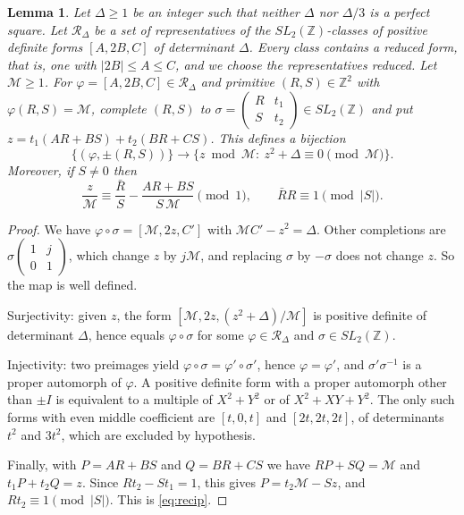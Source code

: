 \documentclass[11pt]{amsart}
\newtheorem{lemma}[theorem]{Lemma}
\theoremstyle{remark}
\theoremstyle{definition}
\numberwithin{equation}{section}
\newcommand{\Z}{\mathbb{Z}}
\begin{document}
\begin{lemma}\label{lem:gauss}
Let $\Delta\ge1$ be an integer such that neither $\Delta$ nor $\Delta/3$ is a perfect square. Let $\mathcal R_\Delta$ be a set of representatives of the $SL_2(\Z)$-classes of positive definite forms $[A,2B,C]$ of determinant $\Delta$. Every class contains a reduced form, that is, one with $|2B|\le A\le C$, and we choose the representatives reduced. Let $\mathcal M\ge1$. For $\varphi=[A,2B,C]\in\mathcal R_\Delta$ and primitive $(R,S)\in\Z^2$ with $\varphi(R,S)=\mathcal M$, complete $(R,S)$ to $\sigma=\left(\begin{smallmatrix}R&t_1\\ S&t_2\end{smallmatrix}\right)\in SL_2(\Z)$ and put $z=t_1(AR+BS)+t_2(BR+CS)$. This defines a bijection
\[
\{(\varphi,\pm(R,S))\}\longrightarrow\{z\bmod\mathcal M:\ z^2+\Delta\equiv0\pmod{\mathcal M}\}.
\]
Moreover, if $S\ne0$ then
\begin{equation}\label{eq:recip}
\frac{z}{\mathcal M}\equiv\frac{\bar R}{S}-\frac{AR+BS}{S\,\mathcal M}\pmod1,\qquad\bar RR\equiv1\pmod{|S|}.
\end{equation}
\end{lemma}

\begin{proof}
We have $\varphi\circ\sigma=[\mathcal M,2z,C']$ with $\mathcal MC'-z^2=\Delta$. Other completions are $\sigma\left(\begin{smallmatrix}1&j\\0&1\end{smallmatrix}\right)$, which change $z$ by $j\mathcal M$, and replacing $\sigma$ by $-\sigma$ does not change $z$. So the map is well defined.

Surjectivity: given $z$, the form $[\mathcal M,2z,(z^2+\Delta)/\mathcal M]$ is positive definite of determinant $\Delta$, hence equals $\varphi\circ\sigma$ for some $\varphi\in\mathcal R_\Delta$ and $\sigma\in SL_2(\Z)$.

Injectivity: two preimages yield $\varphi\circ\sigma=\varphi'\circ\sigma'$, hence $\varphi=\varphi'$, and $\sigma'\sigma^{-1}$ is a proper automorph of $\varphi$. A positive definite form with a proper automorph other than $\pm I$ is equivalent to a multiple of $X^2+Y^2$ or of $X^2+XY+Y^2$. The only such forms with even middle coefficient are $[t,0,t]$ and $[2t,2t,2t]$, of determinants $t^2$ and $3t^2$, which are excluded by hypothesis.

Finally, with $P=AR+BS$ and $Q=BR+CS$ we have $RP+SQ=\mathcal M$ and $t_1P+t_2Q=z$. Since $Rt_2-St_1=1$, this gives $P=t_2\mathcal M-Sz$, and $Rt_2\equiv1\pmod{|S|}$. This is \eqref{eq:recip}.
\end{proof}
\end{document}
